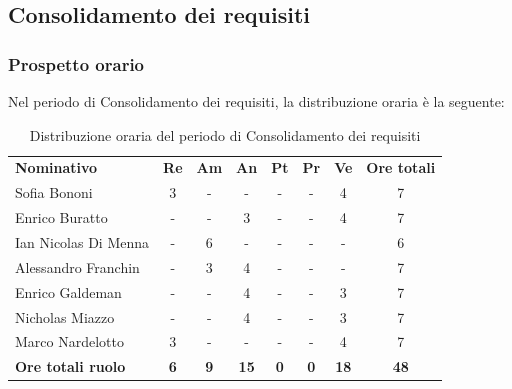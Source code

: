\documentclass[../piano-di-progetto.tex]{subfiles}
\begin{document}
  \subsection{Consolidamento dei requisiti}

  \subsubsection{Prospetto orario}
  Nel periodo di Consolidamento dei requisiti, la distribuzione oraria è la seguente:
  \begin{table}[H]
    \centering
    \begin{tabular}{lccccccc}
      \rowcolor{lightgray}
      \textbf{Nominativo}        & \textbf{Re} & \textbf{Am}  & \textbf{An} & \textbf{Pt}  & \textbf{Pr}   & \textbf{Ve} & \textbf{Ore totali} \\
      Sofia Bononi              & 3          & -          & -           & -          & -          & 4           & 7           \\
      Enrico Buratto            & -          & -          & 3           & -          & -          & 4           & 7           \\
      Ian Nicolas Di Menna      & -          & 6          & -           & -          & -          & -           & 6           \\
      Alessandro Franchin       & -          & 3          & 4           & -          & -          & -           & 7           \\
      Enrico Galdeman           & -          & -          & 4           & -          & -          & 3           & 7           \\
      Nicholas Miazzo           & -          & -          & 4           & -          & -          & 3           & 7           \\
      Marco Nardelotto          & 3          & -          & -           & -          & -          & 4           & 7           \\
      \textbf{Ore totali ruolo} & \textbf{6} & \textbf{9} & \textbf{15} & \textbf{0} & \textbf{0} & \textbf{18} & \textbf{48}
      
    \end{tabular}
    \caption{Distribuzione oraria del periodo di Consolidamento dei requisiti}
  \end{table}
\end{document}
